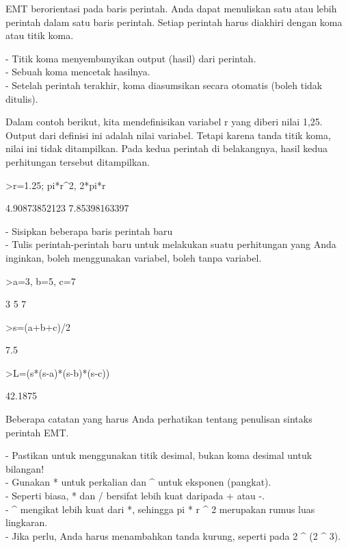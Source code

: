 \documentclass{article}
\begin{document}
\begin{eulernotebook}
\begin{eulercomment}
\begin{eulercomment}
\begin{eulercomment}
EMT berorientasi pada baris perintah. Anda dapat menuliskan satu atau lebih
perintah dalam satu baris perintah. Setiap perintah harus diakhiri dengan koma
atau titik koma.

- Titik koma menyembunyikan output (hasil) dari perintah.\\
- Sebuah koma mencetak hasilnya.\\
- Setelah perintah terakhir, koma diasumsikan secara otomatis (boleh tidak
ditulis).

Dalam contoh berikut, kita mendefinisikan variabel r yang diberi nilai 1,25.
Output dari definisi ini adalah nilai variabel. Tetapi karena tanda titik koma,
nilai ini tidak ditampilkan. Pada kedua perintah di belakangnya, hasil kedua
perhitungan tersebut ditampilkan.
\end{eulercomment}
\begin{eulerprompt}
>r=1.25; pi*r^2, 2*pi*r
\end{eulerprompt}
\begin{euleroutput}
  4.90873852123
  7.85398163397
\end{euleroutput}
\begin{eulercomment}
- Sisipkan beberapa baris perintah baru\\
- Tulis perintah-perintah baru untuk melakukan suatu perhitungan yang
Anda inginkan, boleh menggunakan variabel, boleh tanpa variabel.\\
\end{eulercomment}
\eulersubheading{}
\begin{eulerprompt}
>a=3, b=5, c=7
\end{eulerprompt}
\begin{euleroutput}
  3
  5
  7
\end{euleroutput}
\begin{eulerprompt}
>s=(a+b+c)/2
\end{eulerprompt}
\begin{euleroutput}
  7.5
\end{euleroutput}
\begin{eulerprompt}
>L=(s*(s-a)*(s-b)*(s-c))
\end{eulerprompt}
\begin{euleroutput}
  42.1875
\end{euleroutput}
\begin{eulercomment}
Beberapa catatan yang harus Anda perhatikan tentang penulisan sintaks
perintah EMT.

- Pastikan untuk menggunakan titik desimal, bukan koma desimal untuk
bilangan!\\
- Gunakan * untuk perkalian dan \textasciicircum{} untuk eksponen (pangkat).\\
- Seperti biasa, * dan / bersifat lebih kuat daripada + atau -.\\
- \textasciicircum{} mengikat lebih kuat dari *, sehingga pi * r \textasciicircum{} 2 merupakan rumus
luas lingkaran.\\
- Jika perlu, Anda harus menambahkan tanda kurung, seperti pada 2 \textasciicircum{} (2
\textasciicircum{} 3).


\end{eulercomment}
\end{eulercomment}
\end{eulercomment}
\end{eulernotebook}
\end{document}
